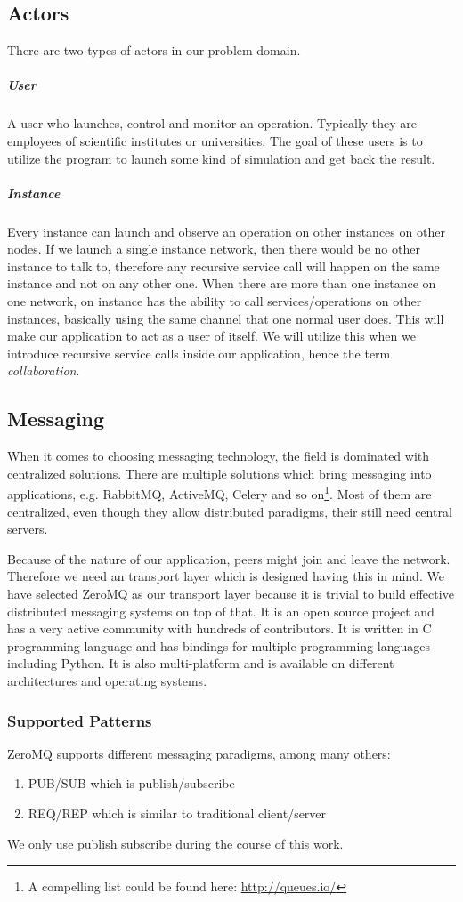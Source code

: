 \subsection{Actors}
There are two types of actors in our problem domain.
\subparagraph{User}
A user who launches, control and monitor an operation. Typically they are employees of scientific institutes or universities.
The goal of these users is to utilize the program to launch some kind of simulation and get back the result.
\subparagraph{Instance}
Every instance can launch and observe an operation on other instances on other nodes. If we launch a single instance
network, then there would be no other instance to talk to, therefore any recursive service call will happen on the
same instance and not on any other one.
When there are more than one instance on one network, on instance has the ability to call services/operations on other
instances, basically using the same channel that one normal user does. This will make our application to act as a user
of itself. We will utilize this when we introduce recursive service calls inside our application, hence the term
\textit{collaboration}.

\subsection{Messaging}
When it comes to choosing messaging technology, the field is dominated with centralized solutions.
There are multiple solutions which bring messaging into applications, 
e.g. RabbitMQ, ActiveMQ, Celery and so on\footnote{A compelling list could be found here: \url{http://queues.io/}}.
Most of them are centralized, even though they allow
distributed paradigms, their still need central servers.

Because of the nature of our application, peers might join and leave the network.
Therefore we need an transport layer which is designed having this in mind. 
We have selected ZeroMQ as our transport layer 
because it is trivial to build effective distributed messaging systems on top of that.
It is an open source project and has a very active community with hundreds of contributors. 
It is written in C programming language and has bindings for multiple programming languages including Python.
It is also multi-platform and is available on different architectures and operating systems.

\subsubsection{Supported Patterns}
ZeroMQ supports different messaging paradigms, among many others:
\begin{enumerate}
\item PUB/SUB which is publish/subscribe
\item REQ/REP which is similar to traditional client/server
\end{enumerate}
We only use publish subscribe during the course of this work.

